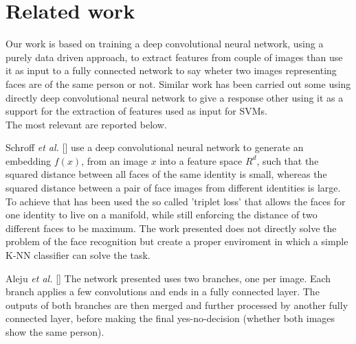 \section{Related work}
Our work is based on training a deep convolutional neural network, using a purely data driven approach, to extract features from couple of images than use it as input to a fully connected network to say wheter two images representing faces are of the same person or not.
Similar work has been carried out some using directly deep convolutional neural network to give a response other using it as a support for the extraction of features used as input for SVMs.
\\
The most relevant are reported below.
\\
\par
Schroff \textit{et al.} [] use a deep convolutional neural network to generate an embedding $f(x)$, from an image $x$ into a feature space $R^d$, such that the squared distance between all faces of the same identity is small, whereas the squared distance between a pair of face images from different identities is large. To achieve that has been used the so called 'triplet loss' that allows the faces for one identity to live on a manifold, while still enforcing the distance of two different faces to be maximum.
The work presented does not directly solve the problem of the face recognition but create a proper enviroment in which a simple K-NN classifier can solve the task.
\\
\par
Aleju \textit{et al.} [] The network presented uses two branches, one per image. Each branch applies a few convolutions and ends in a fully connected layer. The outputs of both branches are then merged and further processed by another fully connected layer, before making the final yes-no-decision (whether both images show the same person).
